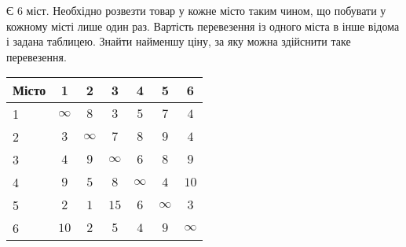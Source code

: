 \documentclass[a4paper,oneside,DIV=12,12pt]{scrartcl}
\begin{document}
	\begin{exercise}
		Є 6 міст. Необхідно розвезти товар у кожне місто таким чином, що побувати у кожному місті лише один раз. Вартість перевезення із одного міста в інше відома і задана таблицею. Знайти найменшу ціну, за яку можна здійснити таке перевезення.
		
		\begin{longtable}[c]{lcccccc}
			\toprule
				Місто & 1 & 2 & 3 & 4 & 5 & 6 \\
			\midrule
			\endhead
			\bottomrule
			\endfoot
			
				1 & $\infty$ & $8$      & $3$      & $5$      & $7$      & $4$ \\
				2 & $3$      & $\infty$ & $7$      & $8$      & $9$      & $4$ \\
				3 & $4$      & $9$      & $\infty$ & $6$      & $8$      & $9$ \\
				4 & $9$      & $5$      & $8$      & $\infty$ & $4$      & $10$ \\
				5 & $2$      & $1$      & $15$     & $6$      & $\infty$ & $3$ \\
				6 & $10$     & $2$      & $5$      & $4$      & $9$      & $\infty$\\
		\end{longtable}
	\end{exercise}
	
\end{document}

